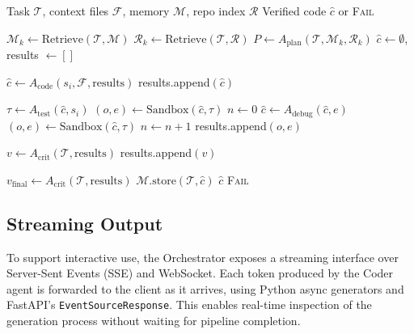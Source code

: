\documentclass[journal]{IEEEtran}
\begin{document}
\begin{algorithm}[t]
\caption{AgentForge Orchestration}
\label{alg:main}
\begin{algorithmic}[1]
\REQUIRE Task $\mathcal{T}$, context files $\mathcal{F}$,
         memory $\mathcal{M}$, repo index $\mathcal{R}$
\ENSURE  Verified code $\hat{c}$ or \textsc{Fail}

\STATE $\mathcal{M}_k \leftarrow \text{Retrieve}(\mathcal{T}, \mathcal{M})$
\STATE $\mathcal{R}_k \leftarrow \text{Retrieve}(\mathcal{T}, \mathcal{R})$
\STATE $P \leftarrow A_\text{plan}(\mathcal{T}, \mathcal{M}_k, \mathcal{R}_k)$
\STATE $\hat{c} \leftarrow \emptyset$,\; results $\leftarrow []$

    \STATE $\hat{c} \leftarrow A_\text{code}(s_i, \mathcal{F}, \text{results})$
    \STATE results.append$(\hat{c})$

    \STATE $\tau \leftarrow A_\text{test}(\hat{c}, s_i)$
    \STATE $(o, e) \leftarrow \text{Sandbox}(\hat{c}, \tau)$
    \STATE $n \leftarrow 0$
      \STATE $\hat{c} \leftarrow A_\text{debug}(\hat{c}, e)$
      \STATE $(o, e) \leftarrow \text{Sandbox}(\hat{c}, \tau)$
      \STATE $n \leftarrow n + 1$
    \ENDWHILE
    \STATE results.append$(o, e)$

    \STATE $v \leftarrow A_\text{crit}(\mathcal{T}, \text{results})$
    \STATE results.append$(v)$
  \ENDIF
\ENDFOR

\STATE $v_\text{final} \leftarrow A_\text{crit}(\mathcal{T}, \text{results})$
  \STATE $\mathcal{M}.\text{store}(\mathcal{T}, \hat{c})$
  \RETURN $\hat{c}$
\ELSE
  \RETURN \textsc{Fail}
\ENDIF
\end{algorithmic}
\end{algorithm}

\subsection{Streaming Output}
\label{sec:streaming}

To support interactive use, the Orchestrator exposes a streaming interface over Server-Sent Events (SSE) and WebSocket. Each token produced by the Coder agent is forwarded to the client as it arrives, using Python async generators and FastAPI's \texttt{EventSourceResponse}. This enables real-time inspection of the generation process without waiting for pipeline completion.
\end{document}
